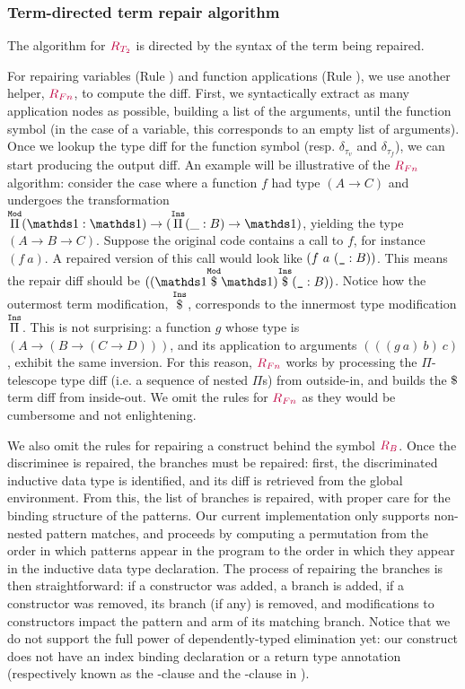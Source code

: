 \subsubsection*{Term-directed term repair algorithm}

The algorithm for $\textcolor{purple}{R_{T_2}}$ is directed by the syntax of the term
being repaired.

For repairing variables (Rule ) and function applications
(Rule ), we use another helper, $\textcolor{purple}{R_{Fn}}$, to compute
the diff.  First, we syntactically extract as many application nodes as
possible, building a list of the arguments, until the function symbol (in the
case of a variable, this corresponds to an empty list of arguments).  Once we
lookup the type diff for the function symbol (resp. $\delta_{\tau_v}$ and
$\delta_{\tau_f}$), we can start producing the output diff.  An example will be
illustrative of the $\textcolor{purple}{R_{Fn}}$ algorithm: consider the case where a
function $f$ had type $(A \rightarrow C)$ and undergoes the transformation
$\MathModPi{\MathSame}{\MathSame}{(\MathInsPi{B}{\_}{\MathSame})}$, yielding the
type $(A \rightarrow B \rightarrow C)$.  Suppose the original code contains a
call to $f$, for instance $(f\ a)$.  A repaired version of this call would look
like $(f\ a\ (\texttt{\_} : B))$.  This means the repair diff should be
$(\MathInsApp{(\MathModApp{\MathSame}{\MathSame})}{(\MathAnnot{\MathHole}{B})})$.
Notice how the outermost term modification, $\overset{\mathtt{Ins}}{\$}$, corresponds to the
innermost type modification $\overset{\mathtt{Ins}}{\Pi}$.  This is not surprising: a function
$g$ whose type is $(A \rightarrow (B \rightarrow (C \rightarrow D)))$, and its
application to arguments $(((g\ a)\ b)\ c)$, exhibit the same inversion.  For
this reason, $\textcolor{purple}{R_{Fn}}$ works by processing the $\Pi$-telescope type diff
(i.e. a sequence of nested $\Pi$s) from outside-in, and builds the $\App$ term
diff from inside-out.  We omit the rules for $\textcolor{purple}{R_{Fn}}$ as they would be
cumbersome and not enlightening.

We also omit the rules for repairing a  construct behind the
symbol $\textcolor{purple}{R_{B}}$.  Once the discriminee is repaired, the branches must
be repaired: first, the discriminated inductive data type is identified, and its
diff is retrieved from the global environment.  From this, the list of branches
is repaired, with proper care for the binding structure of the patterns.  Our
current implementation only supports non-nested pattern matches, and proceeds by
computing a permutation from the order in which patterns appear in the program
to the order in which they appear in the inductive data type declaration.  The
process of repairing the branches is then straightforward: if a constructor was
added, a branch is added, if a constructor was removed, its branch (if any) is
removed, and modifications to constructors impact the pattern and arm of its
matching branch.  Notice that we do not support the full power of
dependently-typed elimination yet: our  construct does not have
an index binding declaration or a return type annotation (respectively known as
the -clause and the -clause in \Gallina{}).

